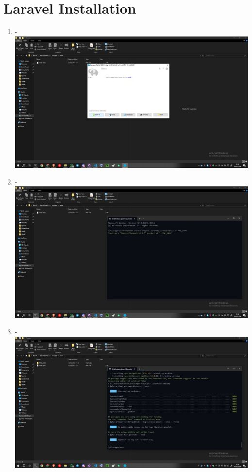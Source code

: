 \documentclass[12pt,titlepage]{article}
\begin{document}
\section{Laravel Installation}

\begin{enumerate}[label= \alph*.]
    \item - \\ \includegraphics[width=.9\textwidth]{images/figures/Laraval Init 1.jpg}
    \item - \\ \includegraphics[width=.9\textwidth]{images/figures/Laraval Init 2.jpg}
    \newpage
    \item - \\ \includegraphics[width=.9\textwidth]{images/figures/Laraval Init 3.jpg}

\end{enumerate}
\end{document}
